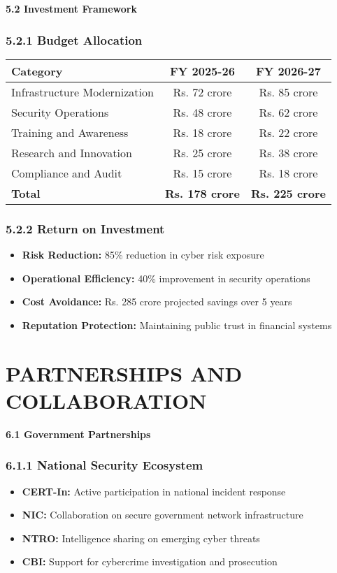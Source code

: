 \documentclass[12pt,a4paper]{report}
\newcommand{\sectionheader}[1]{\textbf{\color{govblue}#1}}
\begin{document}
\sectionheader{5.2 Investment Framework}

\subsection*{5.2.1 Budget Allocation}
\begin{table}[h]
\centering
\begin{tabular}{@{}lcc@{}}
\toprule
\textbf{Category} & \textbf{FY 2025-26} & \textbf{FY 2026-27} \\
\midrule
Infrastructure Modernization & Rs. 72 crore & Rs. 85 crore \\
Security Operations & Rs. 48 crore & Rs. 62 crore \\
Training and Awareness & Rs. 18 crore & Rs. 22 crore \\
Research and Innovation & Rs. 25 crore & Rs. 38 crore \\
Compliance and Audit & Rs. 15 crore & Rs. 18 crore \\
\textbf{Total} & \textbf{Rs. 178 crore} & \textbf{Rs. 225 crore} \\
\bottomrule
\end{tabular}
\end{table}

\subsection*{5.2.2 Return on Investment}
\begin{itemize}[leftmargin=*, itemsep=3pt]
    \item \textbf{Risk Reduction:} 85\% reduction in cyber risk exposure
    \item \textbf{Operational Efficiency:} 40\% improvement in security operations
    \item \textbf{Cost Avoidance:} Rs. 285 crore projected savings over 5 years
    \item \textbf{Reputation Protection:} Maintaining public trust in financial systems
\end{itemize}

\chapter{PARTNERSHIPS AND COLLABORATION}

\sectionheader{6.1 Government Partnerships}

\subsection*{6.1.1 National Security Ecosystem}
\begin{itemize}[leftmargin=*, itemsep=3pt]
    \item \textbf{CERT-In:} Active participation in national incident response
    \item \textbf{NIC:} Collaboration on secure government network infrastructure
    \item \textbf{NTRO:} Intelligence sharing on emerging cyber threats
    \item \textbf{CBI:} Support for cybercrime investigation and prosecution
\end{itemize}
\end{document}
